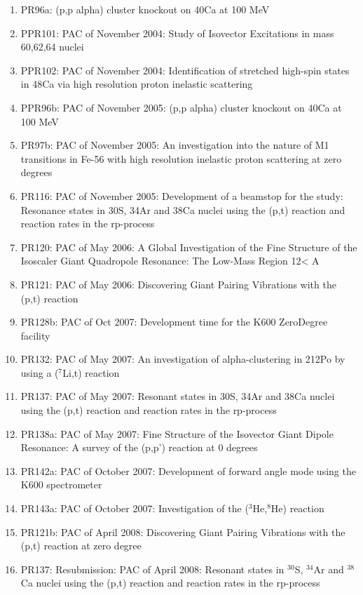 \documentclass[11pt]{report}
\begin{document}
\begin{enumerate}
\item PR96a: (p,p alpha) cluster knockout on 40Ca at 100 MeV 
\item PPR101: PAC of November 2004:    Study of Isovector Excitations in mass 60,62,64 nuclei 
\item PPR102: PAC of November 2004:    Identification of stretched high-spin states in 48Ca via high resolution proton inelastic scattering 
\item PPR96b: PAC of November 2005:    (p,p alpha) cluster knockout on 40Ca at 100 MeV 
\item PR97b: PAC of November 2005:    An investigation into the nature of M1 transitions in Fe-56 with high resolution inelastic proton scattering at zero degrees 
\item PR116: PAC of November 2005:    Development of a beamstop for the study: Resonance states in 30S, 34Ar and 38Ca nuclei using the (p,t) reaction and reaction rates in the rp-process 
\item PR120: PAC of May 2006:     A Global Investigation of the Fine Structure of the Isoscaler Giant Quadropole Resonance: The Low-Mass Region 12< A 
\item PR121: PAC of May 2006:     Discovering Giant Pairing Vibrations with the (p,t) reaction 
\item PR128b: PAC of Oct 2007:   Development time for the K600 ZeroDegree facility 
\item PR132: PAC of May 2007:    An investigation of alpha-clustering in 212Po by using a ($^7$Li,t) reaction 
\item PR137: PAC of May 2007:    Resonant states in 30S, 34Ar and 38Ca nuclei using the (p,t) reaction and reaction rates in the rp-process 
\item PR138a: PAC of May 2007:   Fine Structure of the Isovector Giant Dipole Resonance: A survey of the (p,p') reaction at 0 degrees 
\item PR142a: PAC of October 2007:     Development of forward angle mode using the K600 spectrometer 
\item PR143a: PAC of October 2007:     Investigation of the ($^3$He,$^8$He) reaction 
\item PR121b: PAC of April 2008:     Discovering Giant Pairing Vibrations with the (p,t) reaction at zero degree 
\item PR137:  Resubmission: PAC of April 2008:     Resonant states in $^{30}$S, $^{34}$Ar and $^{38}$Ca nuclei using the (p,t) reaction and reaction rates in the rp-process 

\end{enumerate}
\end{document}
